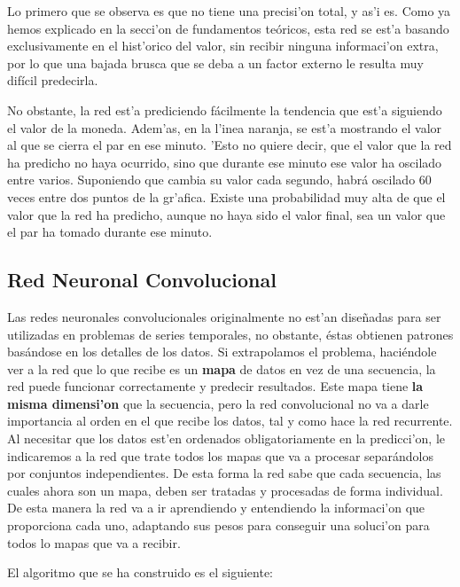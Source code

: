Lo primero que se observa es que no tiene una precisi'on total, y as'i es. Como ya hemos explicado en la secci'on de fundamentos teóricos, esta red se est'a basando exclusivamente en el hist'orico del valor, sin recibir ninguna informaci'on extra, por lo que una bajada brusca que se deba a un factor externo le resulta muy difícil predecirla.

No obstante, la red est'a prediciendo fácilmente la tendencia que est'a siguiendo el valor de la moneda. Adem'as, en la l'inea naranja, se est'a mostrando el valor al que se cierra el par en ese minuto. 'Esto no quiere decir, que el valor que la red ha predicho no haya ocurrido, sino que durante ese minuto ese valor ha oscilado entre varios. Suponiendo que cambia su valor cada segundo, habrá oscilado 60 veces entre dos puntos de la gr'afica. Existe una probabilidad muy alta de que el valor que la red ha predicho, aunque no haya sido el valor final, sea un valor que el par ha tomado durante ese minuto.  




\clearpage




\subsection{Red Neuronal Convolucional}

Las redes neuronales convolucionales originalmente no est'an diseñadas para ser utilizadas en problemas de series temporales, no obstante, éstas obtienen patrones basándose en los detalles de los datos. Si extrapolamos el problema, haciéndole ver a la red que lo que recibe es un \textbf{mapa} de datos en vez de una secuencia, la red puede funcionar correctamente y predecir resultados. Este mapa tiene \textbf{la misma dimensi'on} que la secuencia, pero la red convolucional no va a darle importancia al orden en el que recibe los datos, tal y como hace la red recurrente. 
Al necesitar que los datos est'en ordenados obligatoriamente en la predicci'on, le indicaremos a la red que trate todos los mapas que va a procesar separándolos por conjuntos independientes. De esta forma la red sabe que cada secuencia, las cuales ahora son un mapa, deben ser tratadas y procesadas de forma individual. 
De esta manera la red va a ir aprendiendo y entendiendo la informaci'on que proporciona cada uno, adaptando sus pesos para conseguir una soluci'on para todos lo mapas que va a recibir.


El algoritmo que se ha construido es el siguiente:

